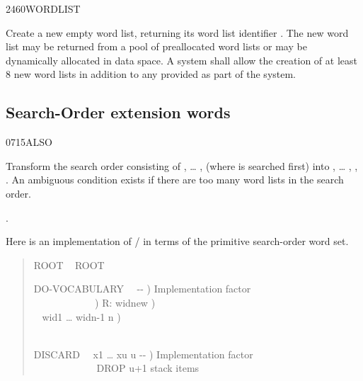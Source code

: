\begin{worddef}{2460}{WORDLIST}
\item {}

	Create a new empty word list, returning its word list identifier
	. The new word list may be returned from a pool of
	preallocated word lists or may be dynamically allocated in data
	space. A system shall allow the creation of at least 8 new word
	lists in addition to any provided as part of the system.
\end{worddef}


\subsection{Search-Order extension words} %
\extended

\begin{worddef}{0715}{ALSO}
\item \stack{}{}

	Transform the search order consisting of , {\ldots}
	,  (where  is searched
	first) into , {\ldots} , ,
	. An ambiguous condition exists if there are too
	many word lists in the search order.

\see {}.

	\begin{rationale} %
		Here is an implementation of / in terms
		of the primitive search-order word set.
		\begin{quote}\ttfamily
		  ROOT ~
		ROOT 

		\word{:} DO-VOCABULARY~~ -{}- )
			 Implementation factor \\
		\tab{}~~ 
				~~~~~~~~~\word{p} )  R: widnew ) \\
		\tab~  
				 wid1 {\ldots} widn-1 n ) \\
		\tab~   \\
		\word{;}

		\word{:} DISCARD~~ x1 {\ldots} xu u -{}- )
			 Implementation factor \\
		   
			~~~~~~~~~~~~ DROP u+1 stack items \\
		\word{;}


\end{quote}
\end{rationale}
\end{worddef}
